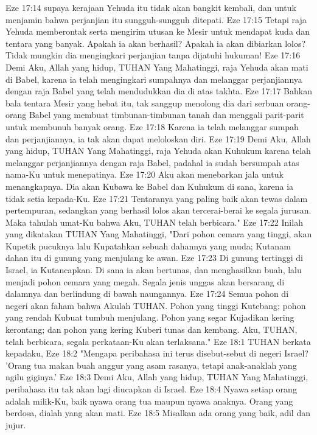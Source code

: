 Eze 17:14  supaya kerajaan Yehuda itu tidak akan bangkit kembali, dan untuk menjamin bahwa perjanjian itu sungguh-sungguh ditepati.
Eze 17:15  Tetapi raja Yehuda memberontak serta mengirim utusan ke Mesir untuk mendapat kuda dan tentara yang banyak. Apakah ia akan berhasil? Apakah ia akan dibiarkan lolos? Tidak mungkin dia mengingkari perjanjian tanpa dijatuhi hukuman!
Eze 17:16  Demi Aku, Allah yang hidup, TUHAN Yang Mahatinggi, raja Yehuda akan mati di Babel, karena ia telah mengingkari sumpahnya dan melanggar perjanjiannya dengan raja Babel yang telah mendudukkan dia di atas takhta.
Eze 17:17  Bahkan bala tentara Mesir yang hebat itu, tak sanggup menolong dia dari serbuan orang-orang Babel yang membuat timbunan-timbunan tanah dan menggali parit-parit untuk membunuh banyak orang.
Eze 17:18  Karena ia telah melanggar sumpah dan perjanjiannya, ia tak akan dapat meloloskan diri.
Eze 17:19  Demi Aku, Allah yang hidup, TUHAN Yang Mahatinggi, raja Yehuda akan Kuhukum karena telah melanggar perjanjiannya dengan raja Babel, padahal ia sudah bersumpah atas nama-Ku untuk menepatinya.
Eze 17:20  Aku akan menebarkan jala untuk menangkapnya. Dia akan Kubawa ke Babel dan Kuhukum di sana, karena ia tidak setia kepada-Ku.
Eze 17:21  Tentaranya yang paling baik akan tewas dalam pertempuran, sedangkan yang berhasil lolos akan tercerai-berai ke segala jurusan. Maka tahulah umat-Ku bahwa Aku, TUHAN telah berbicara."
Eze 17:22  Inilah yang dikatakan TUHAN Yang Mahatinggi, "Dari pohon cemara yang tinggi, akan Kupetik pucuknya lalu Kupatahkan sebuah dahannya yang muda; Kutanam dahan itu di gunung yang menjulang ke awan.
Eze 17:23  Di gunung tertinggi di Israel, ia Kutancapkan. Di sana ia akan bertunas, dan menghasilkan buah, lalu menjadi pohon cemara yang megah. Segala jenis unggas akan bersarang di dalamnya dan berlindung di bawah naungannya.
Eze 17:24  Semua pohon di negeri akan faham bahwa Akulah TUHAN. Pohon yang tinggi Kutebang; pohon yang rendah Kubuat tumbuh menjulang. Pohon yang segar Kujadikan kering kerontang; dan pohon yang kering Kuberi tunas dan kembang. Aku, TUHAN, telah berbicara, segala perkataan-Ku akan terlaksana."
Eze 18:1  TUHAN berkata kepadaku,
Eze 18:2  "Mengapa peribahasa ini terus disebut-sebut di negeri Israel? 'Orang tua makan buah anggur yang asam rasanya, tetapi anak-anaklah yang ngilu giginya.'
Eze 18:3  Demi Aku, Allah yang hidup, TUHAN Yang Mahatinggi, peribahasa itu tak akan lagi diucapkan di Israel.
Eze 18:4  Nyawa setiap orang adalah milik-Ku, baik nyawa orang tua maupun nyawa anaknya. Orang yang berdosa, dialah yang akan mati.
Eze 18:5  Misalkan ada orang yang baik, adil dan jujur.

